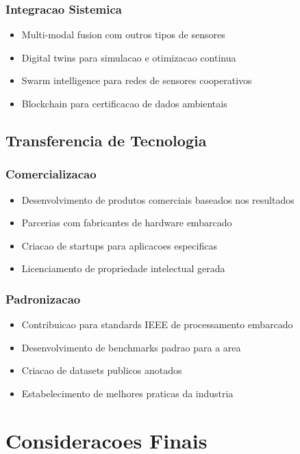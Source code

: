 \subsubsection{Integracao Sistemica}
\begin{itemize}
    \item Multi-modal fusion com outros tipos de sensores
    \item Digital twins para simulacao e otimizacao continua
    \item Swarm intelligence para redes de sensores cooperativos
    \item Blockchain para certificacao de dados ambientais
\end{itemize}

\subsection{Transferencia de Tecnologia}

\subsubsection{Comercializacao}
\begin{itemize}
    \item Desenvolvimento de produtos comerciais baseados nos resultados
    \item Parcerias com fabricantes de hardware embarcado
    \item Criacao de startups para aplicacoes especificas
    \item Licenciamento de propriedade intelectual gerada
\end{itemize}

\subsubsection{Padronizacao}
\begin{itemize}
    \item Contribuicao para standards IEEE de processamento embarcado
    \item Desenvolvimento de benchmarks padrao para a area
    \item Criacao de datasets publicos anotados
    \item Estabelecimento de melhores praticas da industria
\end{itemize}

\section{Consideracoes Finais}\label{sec:consideracoes_finais}


